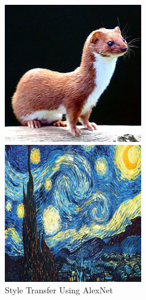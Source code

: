 \documentclass{article}
\begin{document}
\begin{figure}[htp]
\centering
\caption{Style Transfer Using AlexNet}
\label{fig:alex-net-transfer}
    \begin{minipage}{0.3\linewidth}
    \includegraphics[width=\textwidth]{img/other-models/alex-net-p}
    \end{minipage}
    \begin{minipage}{0.3\linewidth}
    \includegraphics[width=\textwidth]{img/other-models/alex-net-a}

\end{minipage}
\end{figure}
\end{document}
